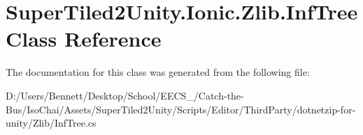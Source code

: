 \hypertarget{class_super_tiled2_unity_1_1_ionic_1_1_zlib_1_1_inf_tree}{}\section{Super\+Tiled2\+Unity.\+Ionic.\+Zlib.\+Inf\+Tree Class Reference}
\label{class_super_tiled2_unity_1_1_ionic_1_1_zlib_1_1_inf_tree}


The documentation for this class was generated from the following file\+:\begin{DoxyCompactItemize}
\item 
D\+:/\+Users/\+Bennett/\+Desktop/\+School/\+E\+E\+C\+S\+\_/\+Catch-\/the-\/\+Bus/\+Iso\+Chai/\+Assets/\+Super\+Tiled2\+Unity/\+Scripts/\+Editor/\+Third\+Party/dotnetzip-\/for-\/unity/\+Zlib/Inf\+Tree.\+cs\end{DoxyCompactItemize}
